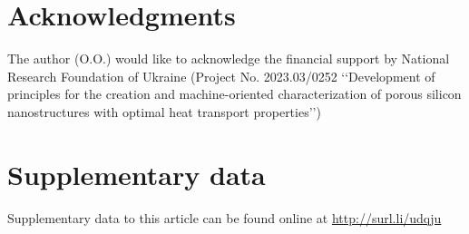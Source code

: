 \documentclass[a4paper,fleqn]{cas-sc}
\begin{document}








\section*{Acknowledgments}
The author (O.O.) would like to acknowledge the financial support by
National Research Foundation of Ukraine (Project No. 2023.03/0252 
‘‘Development of principles for the creation and machine-oriented
characterization of porous silicon nanostructures with optimal
heat transport properties’’)

\section*{Supplementary data}\label{SuplData}
Supplementary data to this article can be found online at
\url{http://surl.li/udqju}
\end{document}
